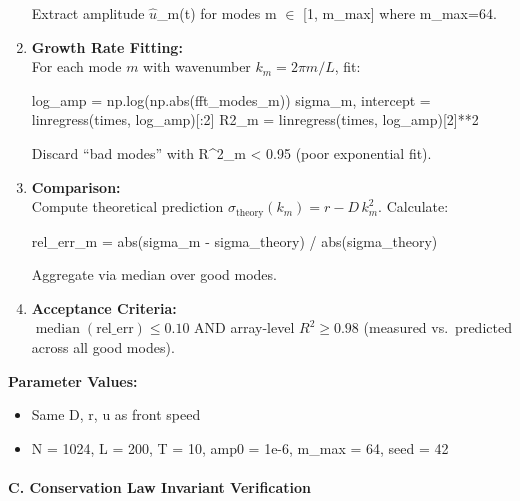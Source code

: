 \documentclass[
]{article}
\newenvironment{Shaded}{}{}
\newcommand{\BuiltInTok}[1]{\textcolor[rgb]{0.00,0.50,0.00}{#1}}
\newcommand{\DecValTok}[1]{\textcolor[rgb]{0.25,0.63,0.44}{#1}}
\newcommand{\NormalTok}[1]{#1}
\newcommand{\OperatorTok}[1]{\textcolor[rgb]{0.40,0.40,0.40}{#1}}
\providecommand{\tightlist}{%
  \setlength{\itemsep}{0pt}\setlength{\parskip}{0pt}}
\begin{document}
\begin{enumerate}
  Extract amplitude \textbar $\hat{u}$\_m(t)\textbar{} for modes m $\in$ {[}1,
  m\_max{]} where m\_max=64.
\item
  \textbf{Growth Rate Fitting:}\\
  For each mode \(m\) with wavenumber \(k_m = 2\pi m / L\), fit:

\begin{Shaded}
\begin{Highlighting}[]
\NormalTok{log\_amp }\OperatorTok{=}\NormalTok{ np.log(np.}\BuiltInTok{abs}\NormalTok{(fft\_modes\_m))}
\NormalTok{sigma\_m, intercept }\OperatorTok{=}\NormalTok{ linregress(times, log\_amp)[:}\DecValTok{2}\NormalTok{]}
\NormalTok{R2\_m }\OperatorTok{=}\NormalTok{ linregress(times, log\_amp)[}\DecValTok{2}\NormalTok{]}\OperatorTok{**}\DecValTok{2}
\end{Highlighting}
\end{Shaded}

  Discard ``bad modes'' with R^{2}\_m \textless{} 0.95 (poor exponential
  fit).
\item
  \textbf{Comparison:}\\
  Compute theoretical prediction
  \(\sigma_{\text{theory}}(k_m) = r - D\,k_m^{2}\). Calculate:

\begin{Shaded}
\begin{Highlighting}[]
\NormalTok{rel\_err\_m }\OperatorTok{=} \BuiltInTok{abs}\NormalTok{(sigma\_m }\OperatorTok{{-}}\NormalTok{ sigma\_theory) }\OperatorTok{/} \BuiltInTok{abs}\NormalTok{(sigma\_theory)}
\end{Highlighting}
\end{Shaded}

  Aggregate via median over good modes.
\item
  \textbf{Acceptance Criteria:}\\
  \(\operatorname{median}(\mathrm{rel\_err}) \le 0.10\) AND array-level
  \(R^{2} \ge 0.98\) (measured vs.~predicted across all good modes).
\end{enumerate}

\textbf{Parameter Values:}

\begin{itemize}
\tightlist
\item
  Same D, r, u as front speed
\item
  N = 1024, L = 200, T = 10, amp0 = 1e-6, m\_max = 64, seed = 42
\end{itemize}

\hypertarget{c.-conservation-law-invariant-verification}{%
\paragraph{C. Conservation Law Invariant
Verification}\label{c.-conservation-law-invariant-verification}}
\end{document}
